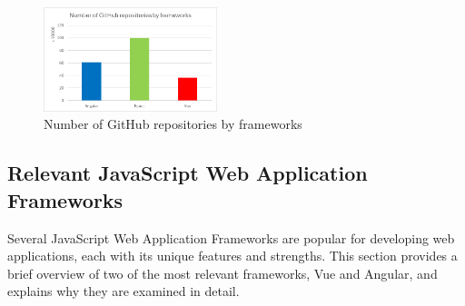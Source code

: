\documentclass[conference]{IEEEtran}
\begin{document}
\begin{figure}[h!]
    \centering
    \includegraphics[width=0.45\textwidth]{image.png}
    \caption{Number of GitHub repositories by frameworks~\cite{cincovic2020comparison}}
    \label{fig:github_repos}
\end{figure}
    



\subsection{Relevant JavaScript Web Application Frameworks}

Several JavaScript Web Application Frameworks are popular for developing web applications, each with its unique features and strengths. This section provides a brief overview of two of the most relevant frameworks, Vue and Angular, and explains why they are examined in detail.

\end{document}

